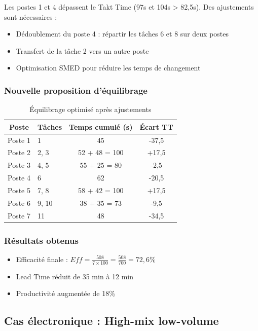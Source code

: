 \documentclass[12pt,a4paper]{article}
\begin{document}
\begin{center}
Les postes 1 et 4 dépassent le Takt Time (97s et 104s > 82,5s). Des ajustements sont nécessaires :

\begin{itemize}
    \item Dédoublement du poste 4 : répartir les tâches 6 et 8 sur deux postes
    \item Transfert de la tâche 2 vers un autre poste
    \item Optimisation SMED pour réduire les temps de changement
\end{itemize}

\subsubsection{Nouvelle proposition d'équilibrage}

\begin{table}[H]
\centering
\caption{Équilibrage optimisé après ajustements}
\label{tab:auto_optimise}
\begin{tabular}{|c|l|c|c|}
\hline
\textbf{Poste} & \textbf{Tâches} & \textbf{Temps cumulé (s)} & \textbf{Écart TT} \\ \hline
Poste 1 & 1 & 45 & -37,5 \\
Poste 2 & 2, 3 & 52 + 48 = 100 & +17,5 \\
Poste 3 & 4, 5 & 55 + 25 = 80 & -2,5 \\
Poste 4 & 6 & 62 & -20,5 \\
Poste 5 & 7, 8 & 58 + 42 = 100 & +17,5 \\
Poste 6 & 9, 10 & 38 + 35 = 73 & -9,5 \\
Poste 7 & 11 & 48 & -34,5 \\
\hline
\end{tabular}
\end{table}

\subsubsection{Résultats obtenus}
\begin{itemize}
    \item Efficacité finale : \(Eff = \frac{508}{7 \times 100} = \frac{508}{700} = 72,6\%\)
    \item Lead Time réduit de 35 min à 12 min
    \item Productivité augmentée de 18\%
\end{itemize}

\subsection{Cas électronique : High-mix low-volume}


\end{center}
\end{document}

